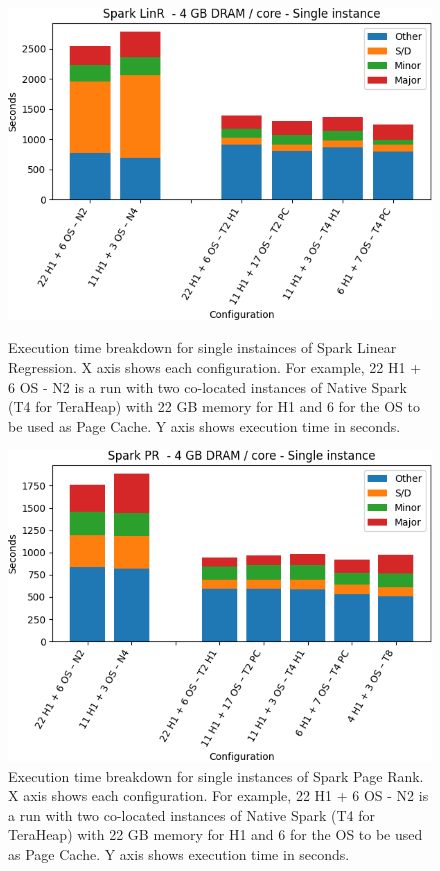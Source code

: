 \begin{figure}[thbp]
\centering
    \includegraphics[width=\linewidth]{./fig/linr64_single.png}
    \caption{Execution time breakdown for single instainces of Spark
    Linear Regression. X axis shows each configuration.
        For example, 22 H1 + 6 OS - N2 is a run with two co-located instances of Native Spark (T4 for TeraHeap) with 22 GB memory for H1 and 6 for the OS to be used as Page Cache. Y axis shows execution time in seconds.}
    \label{fig:linr64_single}
    \includegraphics[width=\linewidth]{./fig/pr64_single.png}
    \caption{Execution time breakdown for single instances of Spark
    Page Rank. X axis shows each configuration.
        For example, 22 H1 + 6 OS - N2 is a run with two co-located instances of Native Spark (T4 for TeraHeap) with 22 GB memory for H1 and 6 for the OS to be used as Page Cache. Y axis shows execution time in seconds.}
    \label{fig:pr64_single}
\end{figure}

